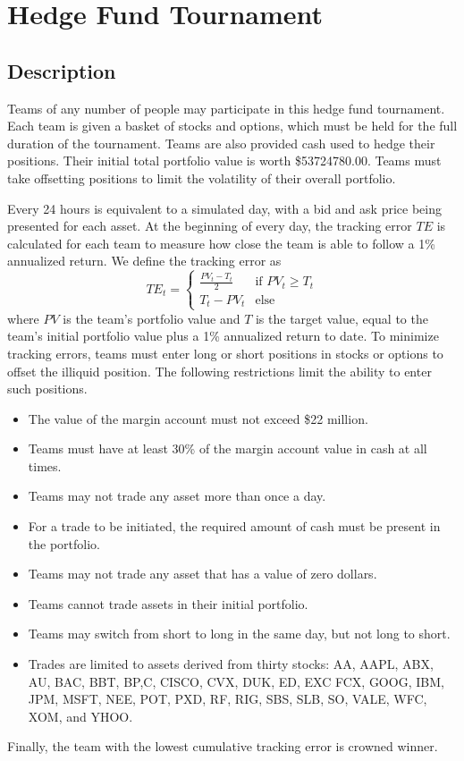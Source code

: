 \documentclass[conference, draftcls]{IEEEtran}
\begin{document}
\section{Hedge Fund Tournament}
\subsection{Description}
Teams of any number of people may participate in this hedge fund tournament. Each team is given a basket of stocks and options, which must be held for the full duration of the tournament. Teams are also provided cash used to hedge their positions. Their initial total portfolio value is worth \$53724780.00. Teams must take offsetting positions to limit the volatility of their overall portfolio. 

Every 24 hours is equivalent to a simulated day, with a bid and ask price being presented for
each asset. At the beginning of every day, the tracking error $TE$ is calculated for each team to measure how close the team is able to follow a 1\% annualized return. We define the tracking error as
\begin{equation}
  TE_t = 
  \begin{cases}
    \frac{PV_t - T_t}{2}  & \text{if } PV_t \geq T_t \\
    T_t - PV_t            & \text{else}
  \end{cases}
\end{equation}
where $PV$ is the team's portfolio value and $T$ is the target value, equal to the team's initial portfolio value plus a 1\% annualized return to date. To minimize tracking errors, teams must enter long or short positions in stocks or options to offset the illiquid position.
The following restrictions limit the ability to enter such positions.
\begin{itemize}
  \item The value of the margin account must not exceed \$22 million.
  \item Teams must have at least 30\% of the margin account value in cash at all times.
  \item Teams may not trade any asset more than once a day.
  \item For a trade to be initiated, the required amount of cash must be present in the portfolio.
  \item Teams may not trade any asset that has a value of zero dollars.
  \item Teams cannot trade assets in their initial portfolio.
  \item Teams may switch from short to long in the same day, but not long to short.
  \item Trades are limited to assets derived from thirty stocks: AA, AAPL, ABX, AU, BAC, BBT, BP,C, CISCO, CVX,
DUK, ED, EXC FCX, GOOG, IBM, JPM, MSFT, NEE, POT, PXD, RF, RIG, SBS, SLB, SO, VALE, WFC, XOM, and YHOO.
\end{itemize}
Finally, the team with the lowest cumulative tracking error is crowned winner.
\end{document}

